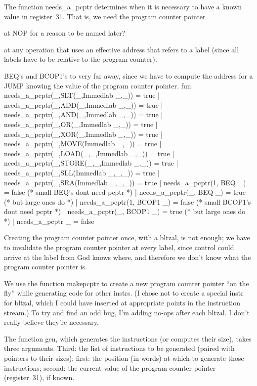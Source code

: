 The function \code{}needs_a_pcptr\edoc{} determines when it is necessary
to have a known value in register~31.
That is, we need the program counter pointer
\itemize
\item 
at \code{}NOP\edoc{} for a reason to be named later?
\item
at any operation that uses an effective address that refers to a label
(since all labels have to be relative to the program counter).
\item
BEQ's and BCOP1's to very far away, 
since we have to compute the address for a JUMP 
knowing the value of the program counter pointer.
\enditemize
\enddocs
{}
\endmoddef
fun needs_a_pcptr(_,SLT(_,Immedlab _,_)) = true
  | needs_a_pcptr(_,ADD(_,Immedlab _,_)) = true
  | needs_a_pcptr(_,AND(_,Immedlab _,_)) = true
  | needs_a_pcptr(_,OR(_,Immedlab _,_)) = true
  | needs_a_pcptr(_,XOR(_,Immedlab _,_)) = true
  | needs_a_pcptr(_,MOVE(Immedlab _,_)) = true
  | needs_a_pcptr(_,LOAD(_,_,Immedlab _,_)) = true
  | needs_a_pcptr(_,STORE(_,_,Immedlab _,_)) = true
  | needs_a_pcptr(_,SLL(Immedlab _,_,_)) = true
  | needs_a_pcptr(_,SRA(Immedlab _,_,_)) = true
  | needs_a_pcptr(1, BEQ _) = false  (* small BEQ's dont need pcptr *)
  | needs_a_pcptr(_, BEQ _) = true   (* but large ones do *)
  | needs_a_pcptr(1, BCOP1 _) = false  (* small BCOP1's dont need pcptr *)
  | needs_a_pcptr(_, BCOP1 _) = true   (* but large ones do *)
  | needs_a_pcptr _ = false
\endcode
{}

Creating the program counter pointer once, with a \code{}bltzal\edoc{}, is not
enough; we have to invalidate the program counter pointer at every
label, since control could arrive at the label from God knows where, and
therefore we don't know what the program counter pointer is.

We use the function \code{}makepcptr\edoc{} to create a new program counter pointer
``on the fly'' while generating code for other \code{}instrs\edoc{}.
(I chose not to create a special \code{}instr\edoc{} for \code{}bltzal\edoc{}, which I
could have inserted at appropriate points in the instruction stream.)
To try and find an odd bug, I'm adding no-ops after each \code{}bltzal\edoc{}.
I don't really believe they're necessary.

The function \code{}gen\edoc{}, which generates the instructions (or computes
their size), takes three arguments.
Third: the list of instructions to be generated (paired with pointers
to their sizes); first: the position (in words) at which to generate 
those instructions;  second: the current value of the program counter
pointer (register~31), if known.

